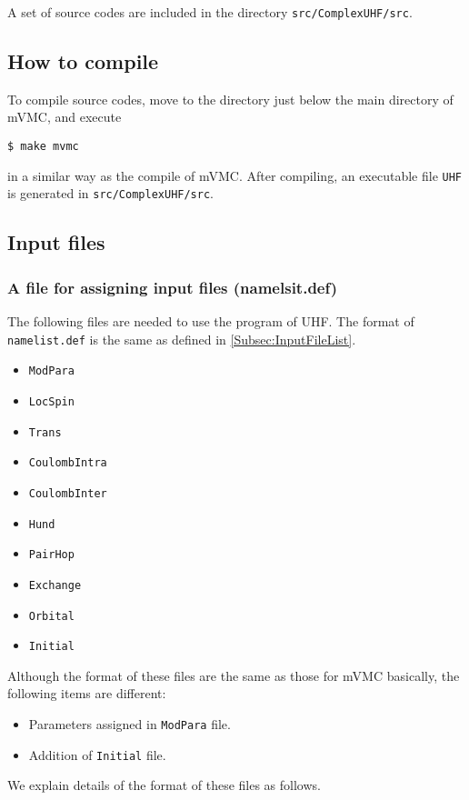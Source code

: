 A set of source codes are included in the directory \verb|src/ComplexUHF/src|.

\subsection{How to compile}

To compile source codes, move to the directory just below the main directory of mVMC, and execute
\begin{verbatim}
$ make mvmc
\end{verbatim}
in a similar way as the compile of mVMC.
After compiling, an executable file \verb|UHF| is generated in \verb|src/ComplexUHF/src|.

\subsection{Input files}

\subsubsection{A file for assigning input files (namelsit.def)}

The following files are needed to use the program of UHF.
The format of \verb|namelist.def| is the same as defined in \ref{Subsec:InputFileList}.\\
\begin{itemize}
\item{\verb|ModPara|}
\item{\verb|LocSpin|}
\item{\verb|Trans|}
\item{\verb|CoulombIntra|}
\item{\verb|CoulombInter|}
\item{\verb|Hund|}
\item{\verb|PairHop|}
\item{\verb|Exchange|}
\item{\verb|Orbital|}
\item{\verb|Initial|}
\end{itemize}
Although the format of these files are the same as those for mVMC basically, the following items are different:
 \begin{itemize}
 \item{Parameters assigned in \verb|ModPara| file.}
 \item{Addition of \verb|Initial| file.}
 \end{itemize}
We explain details of the format of these files as follows.


